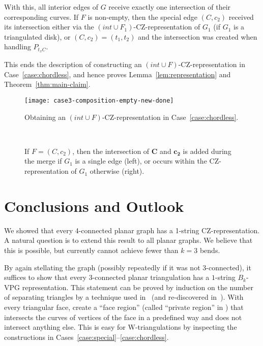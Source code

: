 \documentclass{article}
\renewcommand{\int}[1]{$(\mathit{int}\cup{#1})$}
\newcommand{\bb}[1]{\ensuremath{\mathbf{#1}}}
\newtheorem{observation}[theorem]{Observation}
\begin{document}
With this, all interior edges of $G$ receive exactly one intersection of
their corresponding curves.  If $F$ is non-empty, then the special edge
$(C,c_2)$ received its intersection either via the \int{F_1}-CZ-representation
of $G_1$ (if $G_1$ is a triangulated disk), or $(C,c_2)=(t_1,t_2)$ and 
the intersection was created when handling $P_{t_x C}$.
 
This ends the description of constructing an 
\int{F}-CZ-representation in Case~\ref{case:chordless},
and hence proves Lemma~\ref{lem:representation} and
Theorem~\ref{thm:main-claim}.
    
    

\begin{figure}
	\centering
	\texttt{[image: case3-composition-empty-new-done]}
	\caption{Obtaining an \int{F}-CZ-representation in Case~\ref{case:chordless}.}
	\label{fig:case3-complete}
\end{figure}


\begin{figure}
	\centering
~~~~~~~~~~~
	\caption{If $F=(C,c_2)$, then the intersection of $\bb{C}$ and $\bb{c_2}$ is added during the merge if $G_1$ is a single edge (left), or occurs within
the CZ-representation of $G_1$ otherwise (right).}
        \label{fig:case5extended}
\end{figure}

\section{Conclusions and Outlook}
\label{sec:conclusions}
\label{sec:outlook}

We showed that every 4-connected planar graph has a 1-string CZ-representation. A natural 
question is to extend this result to all planar graphs. We believe that this is possible,
but currently cannot achieve fewer than $k=3$ bends.


\iffalse
\begin{observation}[Chalopin, Gon\c{c}alves, Ochem~{\cite[Lemma~1]{cit:chalopin-string}}]
\label{obs:triangulation-only}
    Every planar graph $G$ is an induced subgraph of a~$3$-connected 
    planar triangulation. 
\end{observation}
\fi
    
By again stellating the graph (possibly repeatedly if it was not 3-connected),
it suffices to show that every $3$-connected
planar triangulation has a $1$-string $B_k$-VPG representation. This statement can be proved by induction
on the number of separating triangles by a technique used in~\cite{cit:chalopin-string}
(and re-discovered in~\cite{cit:mfcs}). With every triangular face,
create a ``face region'' (called ``private region'' in \cite{cit:mfcs})
that intersects the curves of vertices of the face
in a predefined way and does not intersect anything else. This is easy for 
W-triangulations by inspecting the constructions in Cases~\ref{case:special}--\ref{case:chordless}.
\end{document}
